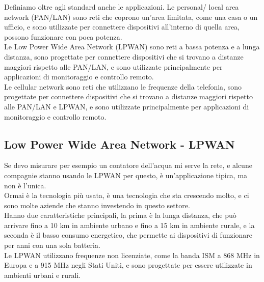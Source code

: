 Definiamo oltre agli standard anche le applicazioni. Le personal/ local area network (PAN/LAN) sono reti che coprono un'area limitata, come una casa o un ufficio, e sono utilizzate per connettere dispositivi all'interno di quella area, possono funzionare con poca potenza.\\

Le Low Power Wide Area Network (LPWAN) sono reti a bassa potenza e a lunga distanza, sono progettate per connettere dispositivi che si trovano a distanze maggiori rispetto alle PAN/LAN, e sono utilizzate principalmente per applicazioni di monitoraggio e controllo remoto.\\

Le cellular network sono reti che utilizzano le frequenze della telefonia, sono progettate per connettere dispositivi che si trovano a distanze maggiori rispetto alle PAN/LAN e LPWAN, e sono utilizzate principalmente per applicazioni di monitoraggio e controllo remoto.\\

\subsection{Low Power Wide Area Network - LPWAN}
Se devo misurare per esempio un contatore dell'acqua mi serve la rete, e alcune compagnie stanno usando le LPWAN per questo, è un'applicazione tipica, ma non è l'unica.\\
Ormai è la tecnologia più usata, è una tecnologia che sta crescendo molto, e ci sono molte aziende che stanno investendo in questo settore.\\
Hanno due caratteristiche principali, la prima è la lunga distanza, che può arrivare fino a 10 km in ambiente urbano e fino a 15 km in ambiente rurale, e la seconda è il basso consumo energetico, che permette ai dispositivi di funzionare per anni con una sola batteria.\\

Le LPWAN utilizzano frequenze non licenziate, come la banda ISM a 868 MHz in Europa e a 915 MHz negli Stati Uniti, e sono progettate per essere utilizzate in ambienti urbani e rurali.\\

